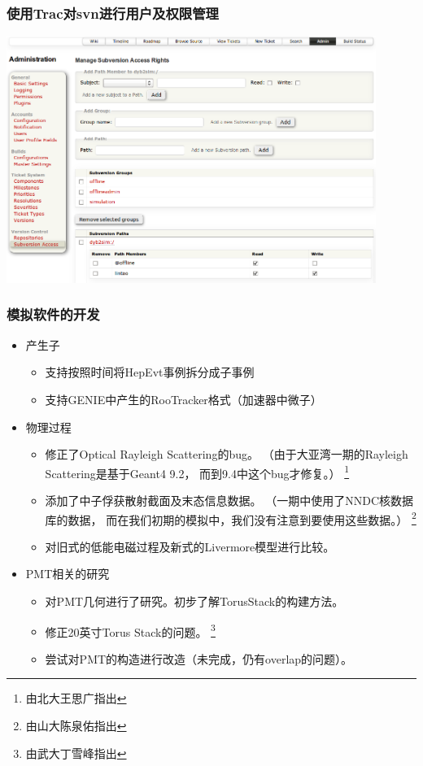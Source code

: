 \begin{frame}
    \frametitle{使用Trac对svn进行用户及权限管理}
    \includegraphics[width=12cm,keepaspectratio]{data/trac_svn.png}
\end{frame}

\begin{frame}
    \frametitle{模拟软件的开发}
    \begin{itemize}
        \item 产生子
            \begin{itemize}
                \item 支持按照时间将HepEvt事例拆分成子事例
                \item 支持GENIE中产生的RooTracker格式（加速器中微子）
            \end{itemize}
        \item 物理过程
            \begin{itemize}
                \item 修正了Optical Rayleigh Scattering的bug。
                      （由于大亚湾一期的Rayleigh Scattering是基于Geant4 9.2，
                       而到9.4中这个bug才修复。）
                       \footnote{由北大王思广指出}
                \item 添加了中子俘获散射截面及末态信息数据。
                      （一期中使用了NNDC核数据库的数据，
                      而在我们初期的模拟中，我们没有注意到要使用这些数据。）
                       \footnote{由山大陈泉佑指出}
                \item 对旧式的低能电磁过程及新式的Livermore模型进行比较。
            \end{itemize}
        \item PMT相关的研究
            \begin{itemize}
                \item 对PMT几何进行了研究。初步了解TorusStack的构建方法。
                \item 修正20英寸Torus Stack的问题。
                      \footnote{由武大丁雪峰指出}
                \item 尝试对PMT的构造进行改造（未完成，仍有overlap的问题）。
            \end{itemize}
    \end{itemize}
\end{frame}

